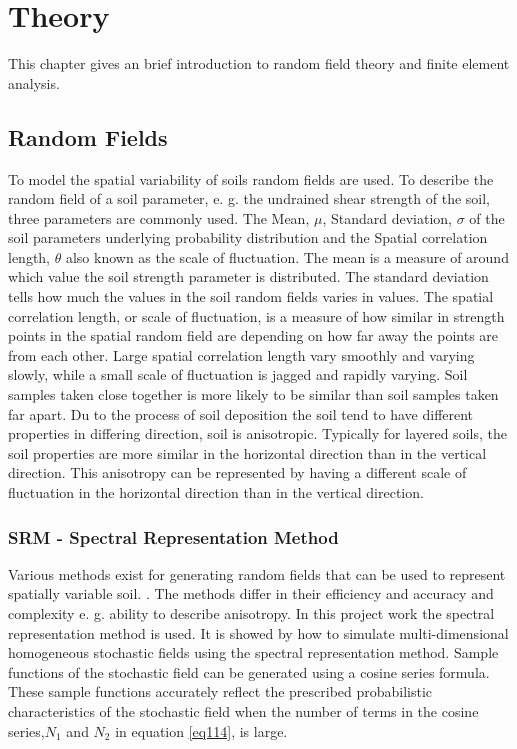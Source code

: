 \chapter[Theory]{Theory}
This chapter gives an brief introduction to random field theory and finite element analysis.
\section{Random Fields}

To model the spatial variability of soils random fields are used. To describe the random field of a soil parameter, e. g. the undrained shear strength of the soil, three parameters are commonly used. 
The Mean, $\mu$, Standard deviation, $\sigma$ of the soil parameters underlying probability distribution and the Spatial correlation length, $\theta$ also known as the scale of fluctuation.   
The mean is a measure of around which value the soil strength parameter is distributed. The standard deviation tells how much the values in the soil random fields varies in values. The spatial correlation length, or scale of fluctuation, is a measure of how similar in strength points in the spatial random field are depending on how far away the points are from each other. 
Large spatial correlation length vary smoothly and varying slowly, while a small scale of fluctuation is jagged and rapidly varying.
Soil samples taken close together is more likely to be similar than soil samples taken far apart.
Du to the process of soil deposition the soil tend to have different properties in differing direction, soil is anisotropic. Typically for layered soils, the soil properties are more similar in the horizontal direction than in the vertical direction. This anisotropy can be represented by having a different scale of fluctuation in the horizontal direction than in the vertical direction.

\subsection{SRM - Spectral Representation Method}

Various methods exist for generating random fields that can be used to represent spatially variable soil. \citep*[see e. g.][Chapter 6]{fenton2008risk}. The methods differ in their efficiency and accuracy and complexity e. g. ability to describe anisotropy.
In this project work the spectral representation method is used. It is showed by \citet*{shinozuka1996simulation} how to simulate multi-dimensional homogeneous stochastic fields using the spectral representation method. 
Sample functions of the stochastic field can be generated using a cosine series formula. These sample functions accurately reflect the prescribed probabilistic characteristics of the stochastic field when the number of terms in the cosine series,$N_1$ and $N_2$ in equation \ref{eq114}, is large.

